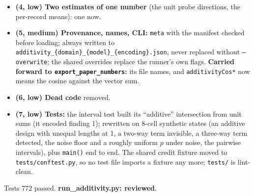 \documentclass{article}
\begin{document}
\begin{itemize}
        shortens a cosine; and the cosine exceeded its ceiling, which assumes independent noise while the corner and
        the marginals share cell states. \textbf{Decided 2026-09-29:} the per-record residual $r = $ corner $-\ \Sigma$
        marginals (its mean estimates twice the three-way term) is reported as a share of the corner's length ---
        raw, the noise floor $\sqrt{\operatorname{tr} S/n}$, and debiased $\sqrt{\max(0, \|\bar r\|^2 -
        \operatorname{tr} S/n)}$ --- and ``no three-way term'' is tested by sign flips of the records' residuals
        (valid if each is symmetric about 0). The cosine is a point value; the pairwise marginal cosines keep
        bootstrap intervals (not length-type; they cover their estimates). On synthetic designs: additive and strong
        two-way both debiased 0 and $p = 0.90$; a small three-way term $p = 0.0002$; pure noise $p$ roughly uniform
        (a test). The scratch run: raw 0.034, floor 0.025, debiased 0.023, $p = 0.0001$ --- most of the raw residual
        is noise, a small three-way component remains.
  \item \textbf{(4, low) Two estimates of one number} (the unit probe directions, the per-record means): one now.
  \item \textbf{(5, medium) Provenance, names, CLI:} \texttt{meta} with the manifest checked before loading; always
        written to \texttt{additivity\_\{domain\}\_\{model\}\_\{encoding\}.json}, never replaced without
        \texttt{--overwrite}; the shared overrides replace the runner's own flags. \textbf{Carried forward to
        \texttt{export\_paper\_numbers}:} its file names, and \texttt{additivityCos*} now means the cosine against
        the vector sum.
  \item \textbf{(6, low) Dead code} removed.
  \item \textbf{(7, low) Tests:} the interval test built its ``additive'' intersection from unit sums (it encoded
        finding 1); rewritten on 8-cell synthetic states (an additive design with unequal lengths at 1, a two-way term
        invisible, a three-way term detected, the noise floor and a roughly uniform $p$ under noise, the pairwise
        intervals), plus \texttt{main()} end to end. The shared credit fixture moved to \texttt{tests/conftest.py},
        so no test file imports a fixture any more; \texttt{tests/} is lint-clean.
\end{itemize}
Tests 772 passed. \textbf{run\_additivity.py: reviewed}.
\end{document}
